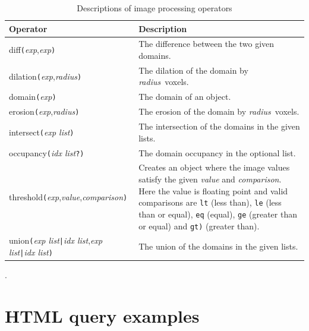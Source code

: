 \documentclass[11pt]{article}
\begin{document}
\begin{table}
\centering
\begin{tabular}{|p{}|p{}|}
\hline
\textbf{Operator}                                                   &  \textbf{Description} \\
\hline
diff\verb=(=\emph{exp},\emph{exp}\verb=)=                           & The difference between the two given domains. \\
dilation\verb=(=\emph{exp},\emph{radius}\verb=)=                    & The dilation of the domain by \emph{radius}\ voxels. \\
domain\verb=(=\emph{exp}\verb=)=                                    & The domain of an object. \\
erosion\verb=(=\emph{exp},\emph{radius}\verb=)=                     & The erosion of the domain by \emph{radius}\ voxels. \\
intersect\verb=(=\emph{exp list}\verb=)=                            & The intersection of the domains in the given lists. \\
occupancy\verb=(=\emph{idx list}\verb=?)=                           & The domain occupancy in the optional list. \\
threshold\verb=(=\emph{exp},\emph{value},\emph{comparison}\verb=)=  & Creates an object where the image values satisfy
						                      the given \emph{value} and \emph{comparison}.
								      Here the value is floating point and valid comparisons
								      are \verb=lt= (less than), \verb=le= (less than or equal), \verb=eq= (equal),
								      \verb=ge= (greater than or equal) and \verb=gt)= (greater than). \\
union\verb=(=\emph{exp list}\verb=|=\emph{idx list},\emph{exp list}\verb=|=\emph{idx list}\verb=)=                                                  & The union of the domains in the given lists. \\
\hline
\end{tabular}
\caption{Descriptions of image processing operators}.
\label{tbl:imgpops}
\end{table}

\section{HTML query examples}
\end{document}
